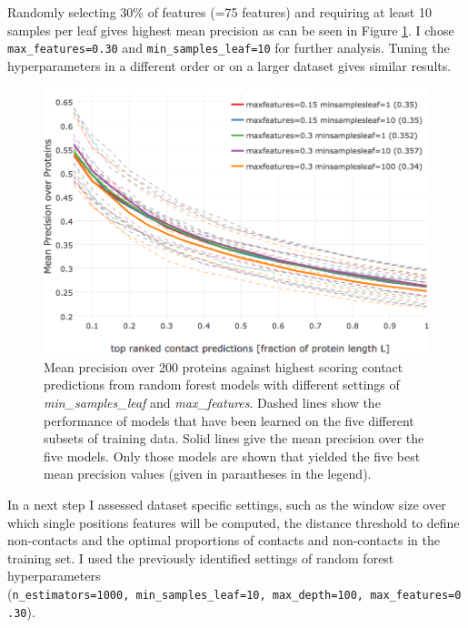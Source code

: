 \documentclass[11pt,a4paper,twoside]{book}
\theoremstyle{definition}
\theoremstyle{definition}
\theoremstyle{remark}
\begin{document}
Randomly selecting 30\% of features (=75 features) and requiring at
least 10 samples per leaf gives highest mean precision as can be seen in
Figure \ref{fig:rf-gridsearch-maxdepth-minsampleleaf}. I chose
\texttt{max\_features=0.30} and \texttt{min\_samples\_leaf=10} for
further analysis. Tuning the hyperparameters in a different order or on
a larger dataset gives similar results.










\begin{figure}

{\centering \includegraphics[width=1\linewidth]{img/random_forest_contact_prior/new_gridsearch/precision_vs_rank_cv_on_test_random_forest_maxfeatures_minsampleleaf_top5_notitle} 

}

\caption{Mean precision over 200
proteins against highest scoring contact predictions from random forest
models with different settings of \emph{min\_samples\_leaf} and
\emph{max\_features}. Dashed lines show the performance of models that
have been learned on the five different subsets of training data. Solid
lines give the mean precision over the five models. Only those models
are shown that yielded the five best mean precision values (given in
parantheses in the legend).}\label{fig:rf-gridsearch-maxdepth-minsampleleaf}
\end{figure}

In a next step I assessed dataset specific settings, such as the window
size over which single positions features will be computed, the distance
threshold to define non-contacts and the optimal proportions of contacts
and non-contacts in the training set. I used the previously identified
settings of random forest hyperparameters
(\texttt{n\_estimators=1000,\ min\_samples\_leaf=10,\ max\_depth=100,\ max\_features=0.30}).
\end{document}

